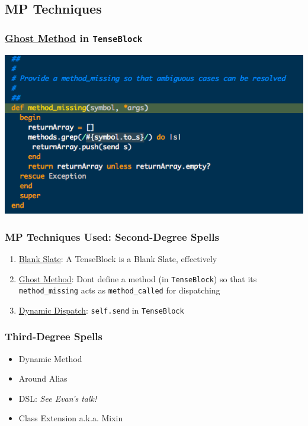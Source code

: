 \documentclass[slidestop,compress,mathserif]{beamer}
\begin{document}
\subsection{MP Techniques} %
\label{sub:methods}

\begin{frame}
	\frametitle{\underline{Ghost Method} in \texttt{TenseBlock}}
	\begin{center}
		\includegraphics[scale=0.45]{img/tenseblock_mm.png}
	\end{center}

\end{frame}

\begin{frame}
	\frametitle{MP Techniques Used:  Second-Degree Spells}
	\begin{enumerate}
		\item \underline{Blank Slate}:  A TenseBlock is a Blank Slate, effectively
		\item \underline{Ghost Method}:  Dont define a method (in \texttt{TenseBlock}) so that its \texttt{method\_missing} acts as \texttt{method\_called} for dispatching
		\item \underline{Dynamic Dispatch}:  \texttt{self.send} in \texttt{TenseBlock}
	\end{enumerate}
\end{frame}

\begin{frame}
	\frametitle{Third-Degree Spells}
	\begin{itemize}
		\item Dynamic Method
		\item Around Alias
		\item DSL:  \emph{See Evan's talk!}
		\item Class Extension a.k.a. Mixin
	\end{itemize}
\end{frame}
\end{document}
